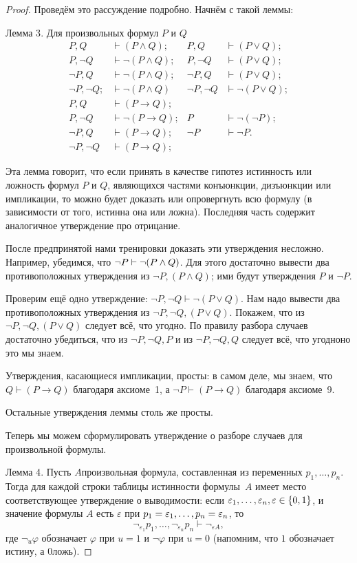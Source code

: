 \begin{proof}
Проведём это рассуждение подробно. Начнём с такой леммы:

\textsf{Лемма 3}. Для произвольных формул $P$ и $Q$
\begin{align*}
P,Q&\vdash (P\land Q);& P,Q&\vdash (P\lor Q);\\
P,\lnot Q&\vdash \lnot (P\land Q);& P,\lnot Q&\vdash (P\lor Q);\\
\lnot P,Q&\vdash \lnot (P\land Q);& \lnot P,Q&\vdash (P\lor Q);\\
\lnot P, \lnot Q;&\vdash \lnot (P\land Q)& \lnot P,
\lnot Q&\vdash \lnot (P\lor Q);\\[1.5ex]
P,Q&\vdash (P\to Q);&&\\
P,\lnot Q&\vdash \lnot (P\to Q);& P&\vdash \lnot (\lnot P);\\
\lnot P,Q&\vdash (P\to Q);& \lnot P&\vdash \lnot P.\\
\lnot P, \lnot Q&\vdash (P\to Q);&&
\end{align*}

Эта лемма говорит, что если принять в качестве гипотез
истинность или ложность формул $P$ и $Q$, являющихся частями
конъюнкции, дизъюнкции или импликации, то можно будет доказать
или опровергнуть всю формулу (в зависимости от того, истинна она
или ложна). Последняя часть содержит аналогичное утверждение про
от\-рицание.

После предпринятой нами тренировки доказать эти утверждения
несложно. Например, убедимся, что $\lnot P\hm\vdash\lnot(P\land
Q)$. Для этого достаточно вывести два противоположных
утверждения из $\lnot P, (P\land Q)$; ими будут утверждения $P$
и $\lnot P$.

Проверим ещё одно утверждение: $\lnot P, \lnot Q\vdash\lnot
(P\lor Q)$. Нам надо вывести два противоположных утверждения из
$\lnot P, \lnot Q, (P\lor Q)$. Покажем, что из $\lnot P, \lnot
Q, (P\lor Q)$ следует всё, что угодно. По правилу разбора
случаев достаточно убедиться, что из $\lnot P, \lnot Q, P$ и из
$\lnot P, \lnot Q, Q$ следует всё, что угодно\т но это мы знаем.

Утверждения, касающиеся импликации, просты: в самом деле, мы
знаем, что $Q\vdash (P\to Q)$ благодаря аксиоме~1, а $\lnot
P\vdash (P\to Q)$ благодаря аксиоме~9.

Остальные утверждения леммы столь же просты.

Теперь мы можем сформулировать утверждение о разборе случаев для
произвольной формулы.

\textsf{Лемма 4}. Пусть $A$\т произвольная формула, составленная
из переменных $p_1,\ldots,p_n$. Тогда для каж\-дой строки таблицы
истинности формулы~$A$ имеет место соответствующее утверждение о
выводимости: если $\varepsilon_1,\dots,\varepsilon_n,
\varepsilon\hm\in\{0,1\}$, и значение формулы $A$ есть
$\varepsilon$ при $p_1=\varepsilon_1,\dots,p_n\hm=\varepsilon_n$,
то
        $$
\lnot_{\varepsilon_1} p_1,\dots,\lnot_{\varepsilon_n} p_n
        \vdash
\lnot_{\varepsilon A},
        $$
где $\lnot_u \varphi$ обозначает $\varphi$ при $u=1$ и
$\lnot \varphi$ при $u=0$ (напомним, что $1$ обозначает истину,
а $0$\т ложь).


\end{proof}
